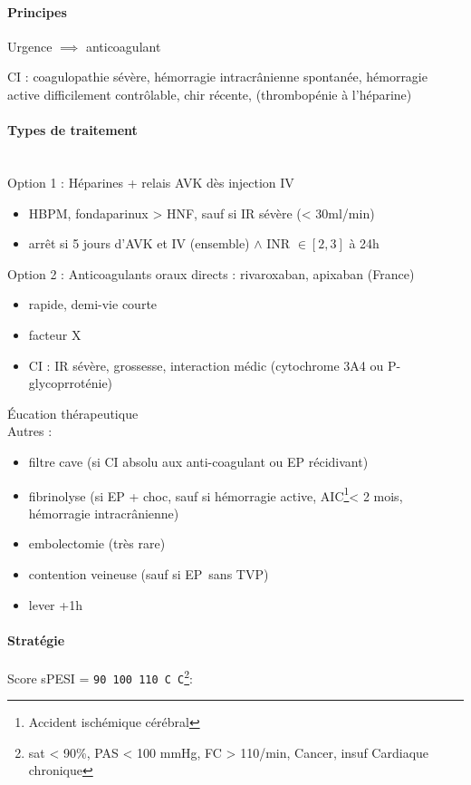 \paragraph{Principes}
Urgence \skull $\implies$ anticoagulant

CI : coagulopathie sévère, hémorragie intracrânienne spontanée, hémorragie
active difficilement contrôlable, chir récente, (thrombopénie à l'héparine)

\paragraph{Types de traitement}\mbox{}\\
Option 1 : Héparines + relais AVK dès injection IV
\begin{itemize}
\item HBPM, fondaparinux > HNF, sauf si IR sévère (< 30ml/min)
\item arrêt si 5 jours d'AVK et IV (ensemble) $\wedge$ INR $\in [2,3]$ à 24h
\end{itemize}
Option 2 : Anticoagulants oraux directs : rivaroxaban, apixaban (France)
\begin{itemize}
\item rapide, demi-vie courte
\item facteur X
\item CI : IR sévère, grossesse, interaction médic (cytochrome 3A4 ou
  P-glycoprroténie)
\end{itemize}
Éucation thérapeutique\\
Autres :
\begin{itemize}
\item filtre cave (si CI absolu aux anti-coagulant ou EP récidivant)
\item fibrinolyse (si EP + choc, sauf si hémorragie active,
  AIC\footnote{Accident ischémique cérébral}< 2 mois,
  hémorragie intracrânienne)
\item embolectomie (très rare)
\item contention veineuse (sauf si EP sans TVP)
\item lever +1h
\end{itemize}

\paragraph{Stratégie}
Score sPESI = \texttt{90 100 110 C C}\footnote{sat < 90\%, PAS < 100 mmHg, FC >
110/min, Cancer, insuf Cardiaque chronique}:


